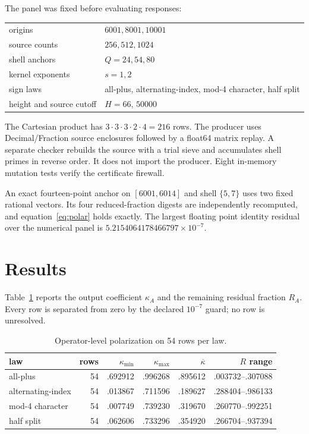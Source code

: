 \documentclass[10pt]{article}
\begin{document}
The panel was fixed before evaluating responses:
\begin{center}
\small
\begin{tabular}{ll}
\toprule
origins & $6001,8001,10001$\\
source counts & $256,512,1024$\\
shell anchors & $Q=24,54,80$\\
kernel exponents & $s=1,2$\\
sign laws & all-plus, alternating-index, mod-4 character, half split\\
height and source cutoff & $H=66$, $50000$\\
\bottomrule
\end{tabular}
\end{center}
The Cartesian product has $3\cdot3\cdot3\cdot2\cdot4=216$ rows.  The
producer uses Decimal/Fraction source enclosures followed by a float64 matrix
replay.  A separate checker rebuilds the source with a trial sieve and
accumulates shell primes in reverse order.  It does not import the producer.
Eight in-memory mutation tests verify the certificate firewall.

An exact fourteen-point anchor on $[6001,6014]$ and shell $\{5,7\}$ uses two
fixed rational vectors.  Its four reduced-fraction digests are independently
recomputed, and equation~\eqref{eq:polar} holds exactly.  The largest floating
point identity residual over the numerical panel is
$5.2154064178466797\times10^{-7}$.

\section{Results}

Table~\ref{tab:summary} reports the output coefficient $\kappa_A$ and the
remaining residual fraction $R_A$.  Every row is separated from zero by the
declared $10^{-7}$ guard; no row is unresolved.

\begin{table}[h]
\centering\small
\caption{Operator-level polarization on 54 rows per law.}
\label{tab:summary}
\begin{tabular}{lrrrrr}
\toprule
law & rows & $\kappa_{\min}$ & $\kappa_{\max}$ & $\overline\kappa$ & $R$ range\\
\midrule
all-plus & 54 & .692912 & .996268 & .895612 & .003732--.307088\\
alternating-index & 54 & .013867 & .711596 & .189627 & .288404--.986133\\
mod-4 character & 54 & .007749 & .739230 & .319670 & .260770--.992251\\
half split & 54 & .062606 & .733296 & .354920 & .266704--.937394\\
\bottomrule
\end{tabular}
\end{table}
\end{document}

